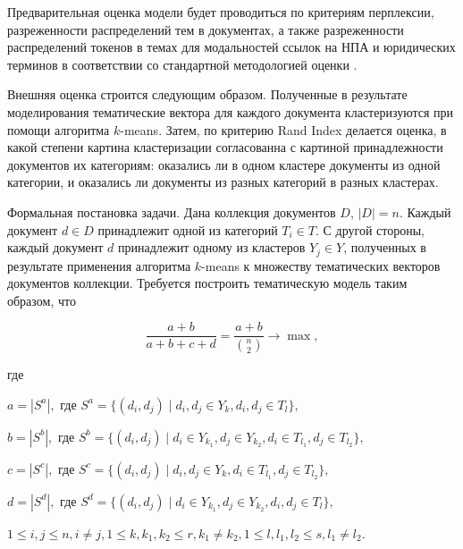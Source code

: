 \documentclass[12pt]{article}
\begin{document}

Предварительная оценка модели будет проводиться по критериям перплексии, разреженности распределений тем в документах, а также разреженности распределений токенов в темах для модальностей ссылок на НПА и юридических терминов в соответствии со стандартной методологией оценки \cite{vorontsov2015additive}. 

Внешняя оценка строится следующим образом. Полученные в результате моделирования тематические вектора для каждого документа кластеризуются при помощи алгоритма $k$-means. Затем, по критерию Rand Index делается оценка, в какой степени картина кластеризации согласованна с картиной принадлежности документов их категориям:  оказались ли в одном кластере документы из одной категории, и оказались ли документы из разных категорий в разных кластерах.

Формальная постановка задачи. Дана коллекция документов $D$, $|D|=n$. Каждый документ $d\in D$ принадлежит одной из категорий $T_{i}\in T$. С другой стороны, каждый документ $d$ принадлежит одному из кластеров $Y_{j}\in Y$, полученных в результате применения алгоритма $k$-means к множеству тематических векторов документов коллекции. Требуется построить тематическую модель таким образом, что


\begin{equation}
\frac{a+b}{a+b+c+d} = \frac{a+b}{{n \choose 2 }}\to \max,
\end{equation}

где

$a = |S^{a}|,$ где $S^{a} = \{ (d_{i}, d_{j}) \mid d_{i}, d_{j} \in Y_{k}, d_{i}, d_{j} \in T_{l}\},$

$b = |S^{b}|,$ где $S^{b} = \{ (d_{i}, d_{j}) \mid d_{i} \in Y_{k_{1}}, d_{j} \in Y_{k_{2}}, d_{i} \in T_{l_{1}}, d_{j} \in T_{l_{2}}\},$

$c = |S^{c}|,$ где $S^{c} = \{ (d_{i}, d_{j}) \mid d_{i}, d_{j} \in Y_{k}, d_{i} \in T_{l_{1}}, d_{j} \in T_{l_{2}}\},$

$d = |S^{d}|,$ где $S^{d} = \{ (d_{i}, d_{j}) \mid d_{i} \in Y_{k_{1}}, d_{j} \in Y_{k_{2}}, d_{i}, d_{j} \in T_{l}\},$

$1 \leq i,j \leq n, i \neq j, 1 \leq k, k_{1}, k_{2} \leq r, k_{1} \neq k_{2}, 1 \leq l, l_{1},l_{2} \leq s, l_{1} \neq l_{2}.$
\end{document}
